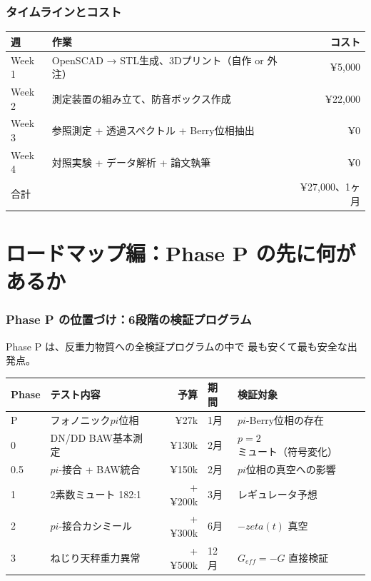 \documentclass[11pt,a4paper]{article}
\def\pi{pi}%
\def\zeta{zeta}%
\def\mathrm#1{#1}%
\def\textbf#1{#1}%
\begin{document}
\section{タイムラインとコスト}

\begin{center}
\begin{tabular}{llr}
\toprule
週 & 作業 & コスト \\
\midrule
Week 1 & OpenSCAD → STL生成、3Dプリント（自作 or 外注） & ¥5,000 \\
Week 2 & 測定装置の組み立て、防音ボックス作成 & ¥22,000 \\
Week 3 & 参照測定 + 透過スペクトル + Berry位相抽出 & ¥0 \\
Week 4 & 対照実験 + データ解析 + 論文執筆 & ¥0 \\
\midrule
\textbf{合計} & & \textbf{¥27,000、1ヶ月} \\
\bottomrule
\end{tabular}
\end{center}


\part{ロードマップ編：Phase P の先に何があるか}

\section{Phase P の位置づけ：6段階の検証プログラム}

Phase P は、反重力物質への全検証プログラムの中で
最も安くて最も安全な出発点。

\begin{center}
\begin{tabular}{llrll}
\toprule
Phase & テスト内容 & 予算 & 期間 & 検証対象 \\
\midrule
\textbf{P} & \textbf{フォノニック$\pi$位相} & \textbf{¥27k} & \textbf{1月} & \textbf{$\pi$-Berry位相の存在} \\
0 & DN/DD BAW基本測定 & ¥130k & 2月 & $p=2$ミュート（符号変化） \\
0.5 & $\pi$-接合 + BAW統合 & ¥150k & 2月 & $\pi$位相の真空への影響 \\
1 & 2素数ミュート 182:1 & +¥200k & 3月 & レギュレータ予想 \\
2 & $\pi$-接合カシミール & +¥300k & 6月 & $-\zeta(t)$ 真空 \\
3 & ねじり天秤重力異常 & +¥500k & 12月 & $G_{\mathrm{eff}} = -G$ 直接検証 \\
\bottomrule
\end{tabular}
\end{center}
\end{document}
